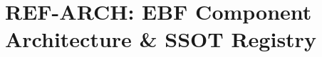 %
%
%

%
%
%
%

\chapter{REF-ARCH: EBF Component Architecture \& SSOT Registry}
\label{app:ref-arch}

\begin{abstract}
This appendix documents all EBF \textbf{``Gefässe''} (containers/vessels)---the
fundamental building blocks of the Evidence-Based Framework. It provides a
complete inventory of component types (chapters, appendices, databases, skills,
hooks, workflows, APIs), their Single Sources of Truth (SSOT), and the
\textbf{Cross-Reference Identification Algorithm} (CRIA) for determining
relevance between components.
\end{abstract}


